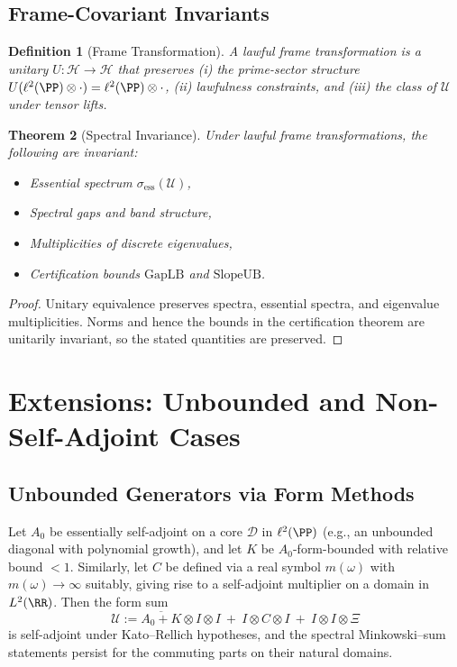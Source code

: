 \documentclass[12]{amsart}
\newtheorem{theorem}{Theorem}
\theoremstyle{plain}
\newtheorem{definition}[theorem]{Definition}
\begin{document}
\subsection{Frame-Covariant Invariants}

\begin{definition}[Frame Transformation]
A \emph{lawful frame transformation} is a unitary $U:\mathcal H\to\mathcal H$ that preserves (i) the prime-sector structure $U(\ell^2(\PP)\otimes\cdot)=\ell^2(\PP)\otimes\cdot$, (ii) lawfulness constraints, and (iii) the class of $\mathcal U$ under tensor lifts.
\end{definition}

\begin{theorem}[Spectral Invariance]
Under lawful frame transformations, the following are invariant:
\begin{itemize}
    \item Essential spectrum $\sigma_{\mathrm{ess}}(\mathcal U)$,
    \item Spectral gaps and band structure,
    \item Multiplicities of discrete eigenvalues,
    \item Certification bounds $\mathrm{GapLB}$ and $\mathrm{SlopeUB}$.
\end{itemize}
\end{theorem}

\begin{proof}
Unitary equivalence preserves spectra, essential spectra, and eigenvalue multiplicities. Norms and hence the bounds in the certification theorem are unitarily invariant, so the stated quantities are preserved.
\end{proof}

\section{Extensions: Unbounded and Non-Self-Adjoint Cases}\label{sec:extensions}

\subsection{Unbounded Generators via Form Methods}
Let $A_0$ be essentially self-adjoint on a core $\mathcal D$ in $\ell^2(\PP)$ (e.g., 
an unbounded diagonal with polynomial growth), and let $K$ be $A_0$-form-bounded with relative bound $<1$.
Similarly, let $C$ be defined via a real symbol $m(\omega)$ with $m(\omega)\to\infty$ suitably, giving rise to a self-adjoint multiplier on a domain in $L^2(\RR)$.
Then the form sum
\[
\mathcal U := \overline{A_0+K}\otimes I\otimes I\ +\ I\otimes C\otimes I\ +\ I\otimes I\otimes \Xi
\]
is self-adjoint under Kato–Rellich hypotheses, and the spectral Minkowski–sum statements persist for the commuting parts on their natural domains.
\end{document}
